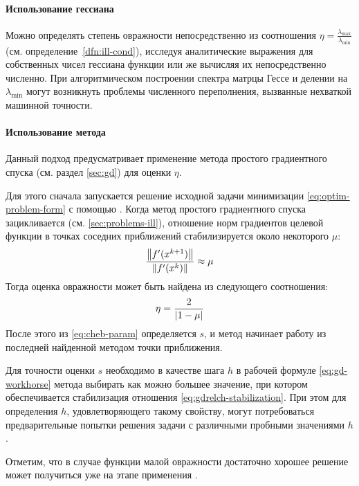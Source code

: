 \paragraph{Использование гессиана}

Можно определять степень овражности непосредственно из соотношения
$\eta=\frac{\lambda_{\max}}{\lambda_{\min}}$ (см.
определение \ref{dfn:ill-cond}), исследуя аналитические выражения для
собственных чисел гессиана функции или же вычисляя их непосредственно
численно. При алгоритмическом построении спектра матрцы Гессе и
делении на $\lambda_{\min}$ могут возникнуть проблемы численного
переполнения, вызванные нехваткой машинной точности.

\paragraph{Использование метода \gd{}}

Данный подход предусматривает применение метода простого градиентного
спуска (см. раздел \ref{sec:gd}) для оценки $\eta$. 

Для этого сначала запускается решение исходной задачи минимизации
\eqref{eq:optim-problem-form} с помощью \gd{}. Когда метод простого
градиентного спуска зацикливается (см. \ref{sec:problems-ill}),
отношение норм градиентов целевой функции в точках соседних
приближений стабилизируется около некоторого $\mu$:
\begin{equation}
  \label{eq:gdrelch-stabilization}
  \frac{\left \lVert{f'(x^{k+1})}\right \rVert}{\left \lVert{f'(x^k)}\right \rVert} \approx \mu
\end{equation}
Тогда оценка овражности может быть найдена из следующего
соотношения:
\begin{equation}
  \label{eq:gdrelch-param}
  \eta = \frac{2}{\left \lvert{1-\mu}\right \rvert}
\end{equation}
После этого из \eqref{eq:cheb-param} определяется $s$, и метод
\relch{} начинает работу из последней найденной методом \gd{} точки
приближения.

Для точности оценки $s$ необходимо в качестве шага $h$ в рабочей
формуле \eqref{eq:gd-workhorse} метода \gd{} выбирать как можно
большее значение, при котором обеспечивается стабилизация отношения
\eqref{eq:gdrelch-stabilization}. При этом для определения $h$,
удовлетворяющего такому свойству, могут потребоваться предварительные
попытки решения задачи с различными пробными значениями $h$.

Отметим, что в случае функции малой овражности достаточно хорошее
решение может получиться уже на этапе применения \gd{}.


